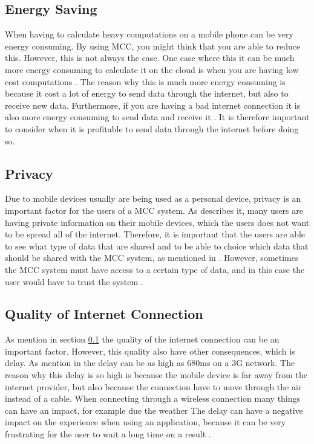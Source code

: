 
\subsection{Energy Saving}\label{EnergySaving}
When having to calculate heavy computations on a mobile phone can be very energy consuming.
By using MCC, you might think that you are able to reduce this.
However, this is not always the case.
One case where this it can be much more energy consuming to calculate it on the cloud is when you are having low cost computations \citep{goyalmobile,liu2013gearing,fernando2013mobile}.
The reason why this is much more energy consuming is because it cost a lot of energy to send data through the internet, but also to receive new data.
Furthermore, if you are having a bad internet connection it is also more energy consuming to send data and receive it \citep{goyalmobile,liu2013gearing,fernando2013mobile}.
It is therefore important to consider when it is profitable to send data through the internet before doing so.

\subsection{Privacy}
Due to mobile devices usually are being used as a personal device, privacy is an important factor for the users of a MCC system.
As \citet{liu2013gearing, fernando2013mobile} describes it, many users are having private information on their mobile devices, which the users does not want to be spread all of the internet.
Therefore, it is important that the users are able to see what type of data that are shared and to be able to choice which data that should be shared with the MCC system, as mentioned in \citet{sanaei2014heterogeneity}.
However, sometimes the MCC system must have access to a certain type of data, and in this case the user would have to trust the system \citep{fernando2013mobile}.

\subsection{Quality of Internet Connection}
As mention in section \ref{EnergySaving} the quality of the internet connection can be an important factor.
However, this quality also have other consequences, which is delay.
As mention in \citep{fernando2013mobile} the delay can be as high as 680ms on a 3G network.
The reason why this delay is so high is because the mobile device is far away from the internet provider, but also because the connection have to move through the air instead of a cable.
When connecting through a wireless connection many things can have an impact, for example due the weather\citep{dev2014review,kumar2013mobile}
The delay can have a negative impact on the experience when using an application, because it can be very frustrating for the user to wait a long time on a result \citep{hazarika2014mobile}.

